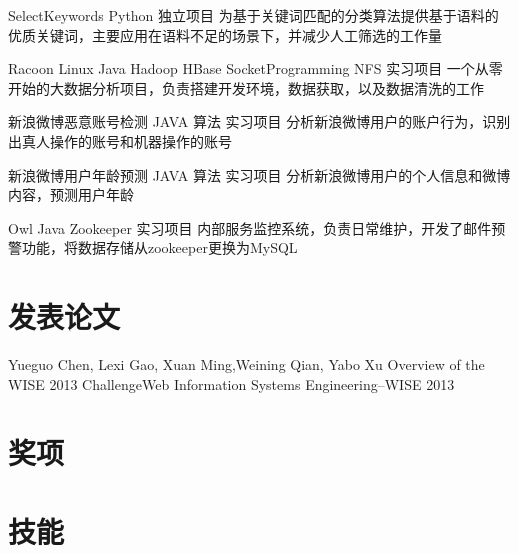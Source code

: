 \documentclass[11pt,a4paper]{moderncv}
\begin{document}
\vspace*{0.2\baselineskip}
{SelectKeywords}
{Python}
{独立项目}{}
{为基于关键词匹配的分类算法提供基于语料的优质关键词，主要应用在语料不足的场景下，并减少人工筛选的工作量}

\vspace*{0.2\baselineskip}
{Racoon}
{Linux Java Hadoop HBase SocketProgramming NFS}
{实习项目}{}
{一个从零开始的大数据分析项目，负责搭建开发环境，数据获取，以及数据清洗的工作}

\vspace*{0.2\baselineskip}
{新浪微博恶意账号检测}
{JAVA 算法}
{实习项目}{}
{分析新浪微博用户的账户行为，识别出真人操作的账号和机器操作的账号}

\vspace*{0.2\baselineskip}
{新浪微博用户年龄预测}
{JAVA 算法}
{实习项目}{}
{分析新浪微博用户的个人信息和微博内容，预测用户年龄}

\vspace*{0.2\baselineskip}
{Owl}
{Java Zookeeper}
{实习项目}{}
{内部服务监控系统，负责日常维护，开发了邮件预警功能，将数据存储从zookeeper更换为MySQL}


\renewcommand{\baselinestretch}{1.0}

\section{发表论文}
{\textnormal{Yueguo Chen, Lexi Gao, } Xuan Ming\textnormal{,Weining Qian, Yabo Xu}}
{Overview of the WISE 2013 Challenge}{Web Information Systems Engineering–WISE 2013 }
{}{}{}

\section{奖项}

\section{技能}

\closesection{}                   %
\end{document}
